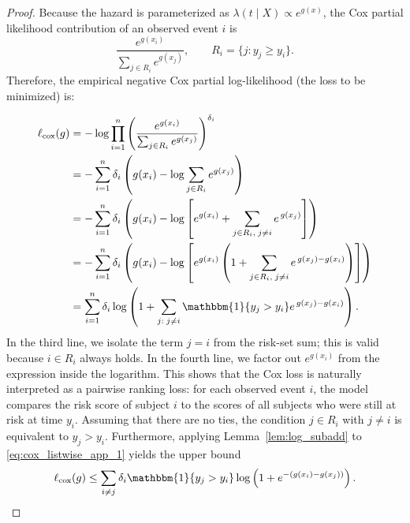 \documentclass[11pt]{article}
\theoremstyle{plain}
\theoremstyle{plain}
\theoremstyle{plain}
\theoremstyle{plain}
\theoremstyle{plain}
\theoremstyle{plain}
\theoremstyle{plain}
\begin{document}
\begin{proof}
Because the hazard is parameterized as $\lambda(t \mid X) \propto e^{g(x)}$, the Cox partial likelihood contribution of an observed event $i$ is
\[
\frac{e^{g(x_i)}}{\sum_{j \in R_i} e^{g(x_j)}},
\qquad
R_i = \{j : y_j \ge y_i\}.
\]
Therefore, the empirical negative Cox partial log-likelihood (the loss to be minimized) is:

\begin{align}
\ell_{\textup{cox}}(g)
&= - \log \prod_{i=1}^n
\left(
\frac{e^{g(x_i)}}{\sum_{j \in R_i} e^{g(x_j)}}
\right)^{\delta_i}
\\
&= - \sum_{i=1}^n \delta_i
\left(
g(x_i) - \log \sum_{j \in R_i} e^{g(x_j)}
\right)
\\
&= - \sum_{i=1}^n \delta_i
\left(
g(x_i) - \log \left[
e^{g(x_i)} + \sum_{j \in R_i,\; j \neq i} e^{\,g(x_j)}
\right]
\right)
\\
&= - \sum_{i=1}^n \delta_i
\left(
g(x_i) - \log \left[
e^{g(x_i)}
\left(
1 + \sum_{j \in R_i,\; j \neq i} e^{\,g(x_j)-g(x_i)}
\right)
\right]
\right)
\\
&= \sum_{i=1}^n \delta_i
\log \left(
1 + \sum_{j:\; j \neq i} \mathbbm{1}\{y_j > y_i\} e^{\,g(x_j)-g(x_i)}
\right).
\label{eq:cox_listwise_app_1}
\end{align}
In the third line, we isolate the term $j=i$ from the risk-set sum; this is valid because $i \in R_i$ always holds. In the fourth line, we factor out $e^{g(x_i)}$ from the expression inside the logarithm. This shows that the Cox loss is naturally interpreted as a pairwise ranking loss: for each observed event $i$, the model compares the risk score of subject $i$ to the scores of all subjects who were still at risk at time $y_i$.
Assuming that there are no ties, the condition $j \in R_i$ with $j \neq i$ is equivalent to $y_j > y_i$. Furthermore, applying Lemma~\ref{lem:log_subadd} to   \eqref{eq:cox_listwise_app_1} yields the upper bound
\begin{equation}
\label{eq:cox_pairwise_bound}
\ell_{\textup{cox}}(g)
\le
\sum_{i \neq j}\delta_i \mathbbm{1}\{y_j > y_i\}
\log \left(
1 + e^{-(g(x_i)-g(x_j))}
\right).
\end{equation}

\end{proof}
\end{document}
